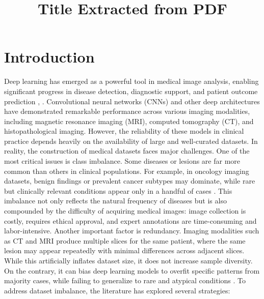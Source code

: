 \documentclass[twocolumn]{svjour3}
\begin{document}
\title{Title Extracted from PDF}
\author{}
\institute{}
\journalname{}
\date{}
\maketitle
\begin{abstract}
\keywords{}
\end{abstract}

\section{Introduction}
Deep learning has emerged as a powerful tool in medical image analysis, enabling significant progress in disease detection, diagnostic support, and patient outcome prediction \cite{ref1}, \cite{ref2}. Convolutional neural networks (CNNs) and other deep architectures have demonstrated remarkable performance across various imaging modalities, including magnetic resonance imaging (MRI), computed tomography (CT), and histopathological imaging. However, the reliability of these models in clinical practice depends heavily on the availability of large and well-curated datasets.
In reality, the construction of medical datasets faces major challenges. One of the most critical issues is class imbalance. Some diseases or lesions are far more common than others in clinical populations. For example, in oncology imaging datasets, benign findings or prevalent cancer subtypes may dominate, while rare but clinically relevant conditions appear only in a handful of cases \cite{ref3}. This imbalance not only reflects the natural frequency of diseases but is also compounded by the difficulty of acquiring medical images: image collection is costly, requires ethical approval, and expert annotations are time-consuming and labor-intensive.
Another important factor is redundancy. Imaging modalities such as CT and MRI produce multiple slices for the same patient, where the same lesion may appear repeatedly with minimal differences across adjacent slices. While this artificially inflates dataset size, it does not increase sample diversity. On the contrary, it can bias deep learning models to overfit specific patterns from majority cases, while failing to generalize to rare and atypical conditions \cite{ref4}.
To address dataset imbalance, the literature has explored several strategies:
\end{document}
